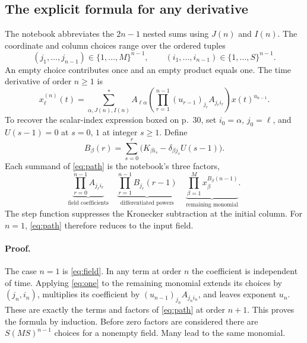 \documentclass[11pt,letterpaper]{article}
\newcommand{\src}[1]{\par\smallskip\noindent{\small\itshape Notebook, #1.}\par\medskip}
\begin{document}
\subsection{The explicit formula for any derivative}
The notebook abbreviates the \(2n-1\) nested sums using \(J(n)\) and \(I(n)\).
The coordinate and column choices range over the ordered tuples
\[
  (j_1,\ldots,j_{n-1})\in\{1,\ldots,M\}^{n-1},\qquad
  (i_1,\ldots,i_{n-1})\in\{1,\ldots,S\}^{n-1}.
\]
An empty choice contributes once and an empty product equals one. The time
derivative of order \(n\ge1\) is
\begin{equation}\label{eq:path}
 \boxed{\displaystyle
 x_\ell^{(n)}(t)=\sum_{\alpha,J(n),I(n)}^{*}
 A_{\ell\alpha}
 \left(\prod_{r=1}^{n-1}(u_{r-1})_{j_r} A_{j_ri_r}\right)
 x(t)^{u_{n-1}} .}
\end{equation}
To recover the scalar-index expression boxed on p.~30, set \(i_0=\alpha\),
\(j_0=\ell\), and \(U(s-1)=0\) at \(s=0\), \(1\) at integer \(s\ge1\).
Define
\[
  B_\beta(r)=\sum_{s=0}^{r}
       \big(K_{\beta i_s}-\delta_{\beta j_s} U(s-1)\big).
\]
Each summand of \eqref{eq:path} is the notebook's three factors,
\begin{equation}\label{eq:three}
 \underbrace{\prod_{r=0}^{n-1} A_{j_r i_r}}_{\text{field coefficients}}
 \quad\underbrace{\prod_{r=1}^{n-1} B_{j_r}(r-1)}_{\text{differentiated powers}}
 \quad\underbrace{\prod_{\beta=1}^M x_\beta^{B_\beta(n-1)}}_{\text{remaining monomial}}.
\end{equation}
The step function suppresses the Kronecker subtraction at the initial column.
For \(n=1\), \eqref{eq:path} therefore reduces to the input field.

\paragraph{Proof.}
The case \(n=1\) is \eqref{eq:field}. In any term at order \(n\) the
coefficient is independent of time. Applying \eqref{eq:one} to the remaining
monomial extends its choices by \((j_n,i_n)\), multiplies its coefficient by
\((u_{n-1})_{j_n}A_{j_n i_n}\), and leaves exponent \(u_n\). These are exactly
the terms and factors of \eqref{eq:path} at order \(n+1\). This proves the
formula by induction. Before zero factors are considered there are
\(S(MS)^{n-1}\) choices for a nonempty field. Many lead to the same monomial.
\src{pp.~5--7, 19--30, 54}
\end{document}
